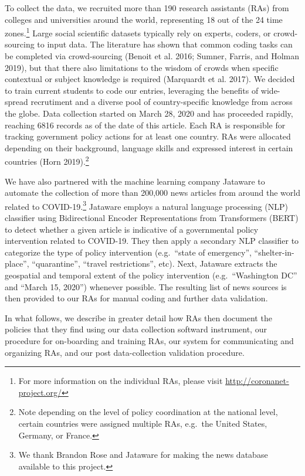 \documentclass[]{article}
\let\rmarkdownfootnote\footnote%
\def\footnote{\protect\rmarkdownfootnote}
\begin{document}
To collect the data, we recruited more than 190 research assistants (RAs) from colleges and universities around the world, representing 18 out of the 24 time zones.\footnote{For more information on the individual RAs, please visit \url{http://coronanet-project.org/}} Large social scientific datasets typically rely on experts, coders, or crowd-sourcing to input data. The literature has shown that common coding tasks can be completed via crowd-sourcing (Benoit et al. 2016; Sumner, Farris, and Holman 2019), but that there also limitations to the wisdom of crowds when specific contextual or subject knowledge is required (Marquardt et al. 2017). We decided to train current students to code our entries, leveraging the benefits of wide-spread recrutiment and a diverse pool of country-specific knowledge from across the globe. Data collection started on March 28, 2020 and has proceeded rapidly, reaching 6816 records as of the date of this article. Each RA is responsible for tracking government policy actions for at least one country. RAs were allocated depending on their background, language skills and expressed interest in certain countries (Horn 2019).\footnote{Note depending on the level of policy coordination at the national level, certain countries were assigned multiple RAs, e.g.~the United States, Germany, or France.}

We have also partnered with the machine learning company Jataware to automate the collection of more than 200,000 news articles from around the world related to COVID-19.\footnote{We thank Brandon Rose and Jataware for making the news database available to this project.} Jataware employs a natural language processing (NLP) classifier using Bidirectional Encoder Representations from Transformers (BERT) to detect whether a given article is indicative of a governmental policy intervention related to COVID-19. They then apply a secondary NLP classifier to categorize the type of policy intervention (e.g.~``state of emergency'', ``shelter-in-place'', ``quarantine'', ``travel restrictions'', etc). Next, Jataware extracts the geospatial and temporal extent of the policy intervention (e.g.~``Washington DC'' and ``March 15, 2020'') whenever possible. The resulting list of news sources is then provided to our RAs for manual coding and further data validation.

In what follows, we describe in greater detail how RAs then document the policies that they find using our data collection softward instrument, our procedure for on-boarding and training RAs, our system for communicating and organizing RAs, and our post data-collection validation procedure.
\end{document}
